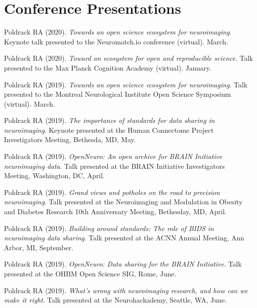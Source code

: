 \section*{Conference Presentations}
\noindent

Poldrack RA (2020). \emph{Towards an open science ecosystem for neuroimaging}. Keynote talk presented to the Neuromatch.io conference (virtual).  March. \vspace{2mm} 

Poldrack RA (2020). \emph{Toward an ecosystem for open and reproducible science}. Talk presented to the Max Planck Cognition Academy (virtual).  January. \vspace{2mm} 

Poldrack RA (2019). \emph{Towards an open science ecosystem for neuroimaging}. Talk presented to the Montreal Neurological Institute Open Science Symposium (virtual).  March. \vspace{2mm} 

Poldrack RA (2019). \emph{The importance of standards for data sharing in neuroimaging}. Keynote presented at the Human Connectome Project Investigators Meeting, Bethesda, MD, May. \vspace{2mm} 

Poldrack RA (2019). \emph{OpenNeuro: An open archive for BRAIN Initiative neuroimaging data}. Talk presented at the BRAIN Initiative Investigators Meeting, Washington, DC, April. \vspace{2mm} 

Poldrack RA (2019). \emph{Grand views and potholes on the road to precision neuroimaging}. Talk presented at the Neuroimaging and Modulation in Obesity and Diabetes Research 10th Anniversary Meeting, Bethesday, MD, April. \vspace{2mm} 

Poldrack RA (2019). \emph{Building around standards: The role of BIDS in neuroimaging data sharing}. Talk presented at the ACNN Annual Meeting, Ann Arbor, MI, September. \vspace{2mm} 

Poldrack RA (2019). \emph{OpenNeuro: Data sharing for the BRAIN Initiative}. Talk presented at the OHBM Open Science SIG, Rome, June. \vspace{2mm} 

Poldrack RA (2019). \emph{What's wrong with neuroimaging research, and how can we make it right}. Talk presented at the Neurohackademy, Seattle, WA, June. \vspace{2mm} 

